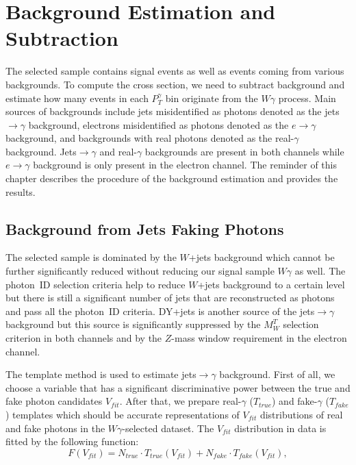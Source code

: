 \section{Background Estimation and Subtraction}
\label{sec:BackgroundSubtraction}

The selected sample contains signal events as well as events coming from various backgrounds. To compute the cross section, we need to subtract background and estimate how many events in each $P_T^\gamma$ bin originate from the $W\gamma$ process. Main sources of backgrounds include jets misidentified as photons denoted as the jets$\rightarrow\gamma$ background, electrons misidentified as photons denoted as the $e\rightarrow\gamma$ background, and backgrounds with real photons denoted as the real-$\gamma$ background. Jets$\rightarrow\gamma$ and real-$\gamma$ backgrounds are present in both channels while $e\rightarrow\gamma$ background is only present in the electron channel. The reminder of this chapter describes the procedure of the background estimation and provides the results.

\subsection{Background from Jets Faking Photons}
\label{sec:BackgroundSubtraction_jtog}

The selected sample is dominated by the $W$+jets background which cannot be further significantly reduced without reducing our signal sample $W\gamma$ as well. The photon~ID selection criteria help to reduce $W$+jets background to a certain level but there is still a significant number of jets that are reconstructed as photons and pass all the photon~ID criteria. DY+jets is another source of the jets$\rightarrow \gamma$ background but this source is significantly suppressed by the $M_W^T$ selection criterion in both channels and by the $Z$-mass window requirement in the electron channel.

The template method is used to estimate jets$ \rightarrow \gamma$ background. First of all, we choose a variable that has a significant discriminative power between the true and fake photon candidates $V_{fit}$. After that, we prepare real-$\gamma$ ($T_{true}$) and fake-$\gamma$ ($T_{fake}$) templates which should be accurate representations of $V_{fit}$ distributions of real and fake photons in the $W\gamma$-selected dataset. The $V_{fit}$ distribution in data is fitted by the following function: 
\begin{equation}\label{eq:F_fit}
F(V_{fit})=N_{true} \cdot T_{true}(V_{fit}) + N_{fake} \cdot T_{fake}(V_{fit}),
\end{equation}

